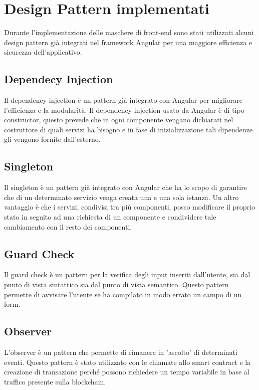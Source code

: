 \section{Design Pattern implementati}
Durante l'implementazione delle maschere di front-end sono stati utilizzati alcuni design pattern già integrati nel framework Angular per una maggiore efficienza e sicurezza dell'applicativo.

\subsection*{Dependecy Injection}
Il dependency injection è un pattern già integrato con Angular per migliorare l’efficienza e la modularità. Il dependency injection usato da Angular è di tipo constructor, questo prevede che in ogni componente vengano dichiarati nel costruttore di quali servizi ha bisogno e in fase di inizializzazione tali dipendenze gli vengono fornite dall’esterno.

\subsection*{Singleton}
Il singleton è un pattern già integrato con Angular che ha lo scopo di garantire che di un determinato servizio venga creata una e una sola istanza. Un altro vantaggio è che i servizi, condivisi tra più componenti, posso modificare il proprio stato in seguito ad una richiesta di un componente e condividere tale cambiamento con il resto dei componenti.

\subsection*{Guard Check}
Il guard check è un pattern per la verifica degli input inseriti dall'utente, sia dal punto di vista sintattico sia dal punto di vista semantico. Questo pattern permette di avvisare l'utente se ha compilato in modo errato un campo di un form.

\subsection*{Observer}
L’observer è un pattern che permette di rimanere in ’ascolto’ di determinati eventi. Questo pattern è stato utilizzato con le chiamate allo smart contract e la creazione di transazione perché possono richiedere un tempo variabile in base al traffico presente sulla blockchain.

\newpage
